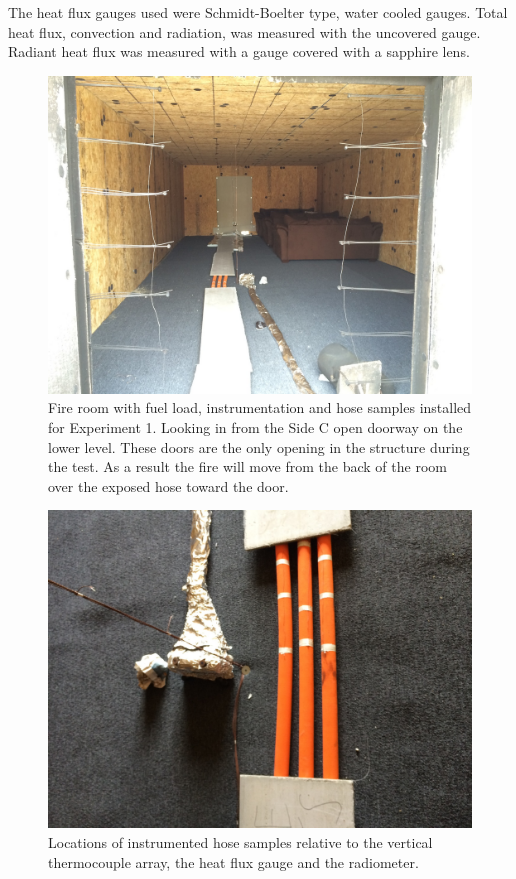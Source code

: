 \documentclass[letterpaper,11pt]{texMemo} %
\begin{document}
The heat flux gauges used were Schmidt-Boelter type, water cooled gauges.  Total heat flux, convection and radiation, was measured with the uncovered gauge. Radiant heat flux was measured with a gauge covered with a sapphire lens.  

\begin{figure}[!ht]
\centering
\includegraphics[width=0.8\columnwidth]{../Figures/Hose_Figures/test_setup_1}
\caption{Fire room with fuel load, instrumentation and hose samples installed for Experiment 1. Looking in from the Side C open doorway on the lower level. These doors are the only opening in the structure during the test. As a result the fire will move from the back of the room over the exposed hose toward the door.}
\label{fig:test_setup_1}
\end{figure}

\begin{figure}[!ht]
\centering
\includegraphics[width=0.8\columnwidth]{../Figures/Hose_Figures/test_setup_1b}
\caption{Locations of instrumented hose samples relative to the vertical thermocouple array, the heat flux gauge and the radiometer.}
\label{fig:test_setup_1b}
\end{figure}
\end{document}
